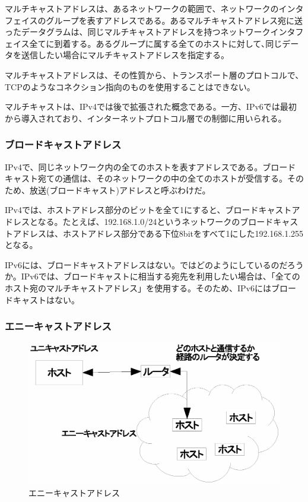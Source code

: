 マルチキャストアドレスは、あるネットワークの範囲で、ネットワークのインタフェイスのグループを表すアドレスである。あるマルチキャストアドレス宛に送ったデータグラムは、同じマルチキャストアドレスを持つネットワークインタフェイス全てに到着する。あるグループに属する全てのホストに対して､同じデータを送信したい場合にマルチキャストアドレスを指定する。

マルチキャストアドレスは、その性質から、トランスポート層のプロトコルで、TCPのようなコネクション指向のものを使用することはできない。

マルチキャストは、IPv4では後で拡張された概念である。一方、IPv6では最初から導入されており、インターネットプロトコル層での制御に用いられる。

\subsubsection{ブロードキャストアドレス}
IPv4で、同じネットワーク内の全てのホストを表すアドレスである。ブロードキャスト宛ての通信は、そのネットワークの中の全てのホストが受信する。そのため、放送(ブロードキャスト)アドレスと呼ぶわけだ。

IPv4では、ホストアドレス部分のビットを全て1にすると、ブロードキャストアドレスとなる。たとえば、192.168.1.0/24というネットワークのブロードキャストアドレスは、ホストアドレス部分である下位8bitをすべて1にした192.168.1.255となる。

IPv6には、ブロードキャストアドレスはない。ではどのようにしているのだろうか。IPv6では、ブロードキャストに相当する宛先を利用したい場合は、「全てのホスト宛のマルチキャストアドレス」を使用する。そのため、IPv6にはブロードキャストはない。

\subsubsection{エニーキャストアドレス}

\begin{figure}[htbp]
	\includegraphics[width=12cm,clip]{draw/anycast.eps}
	\caption{エニーキャストアドレス}
	\label{fig:anycast}
\end{figure}

